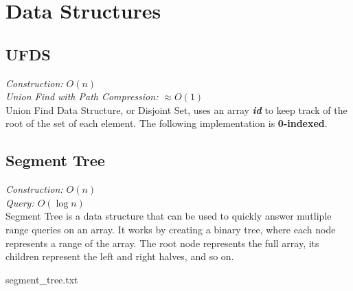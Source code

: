 \documentclass[../hackpack.tex]{subfiles}
\begin{document}
\section{Data Structures}

\subsection{UFDS}
\textit{Construction: $O(n)$} 
\\ 
\textit{Union Find with Path Compression: $\approx O(1)$}
\\
Union Find Data Structure, or Disjoint Set, uses an array \textit{\textbf{id}} to keep track of the root of the set of each element.
The following implementation is \textbf{0-indexed}.


\subsection{Segment Tree}
\textit{Construction: $O(n)$}
\\
\textit{Query: $O(\log{n})$}
\\
Segment Tree is a data structure that can be used to quickly answer mutliple range queries on an array. It works by creating a binary tree, where each node 
represents a range of the array. The root node represents the full array, its children represent the left and right halves, and so on.

{segment_tree.txt}
\end{document}
